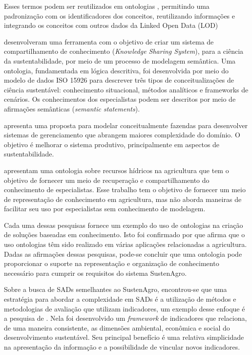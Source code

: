 Esses termos podem ser reutilizados em ontologias \citep{DCMIPro841},
permitindo uma padronização com os identificadores dos conceitos,
reutilizando informações e integrando os conceitos com outros dados
da \foreignlanguage{english}{Linked Open Data} (\foreignlanguage{english}{LOD})

\citet{kraines2011system} desenvolveram uma ferramenta com o objetivo
de criar um sistema de compartilhamento de conhecimento (\foreignlanguage{english}{\emph{Knowledge
Sharing System}}), para a ciência da sustentabilidade, por meio de
um processo de modelagem semântica. Uma ontologia, fundamentada em
lógica descritiva, foi desenvolvida por meio do modelo de dados ISO
15926 para descrever três tipos de conceitualizações de ciência sustentável:
conhecimento situacional, métodos analíticos e \foreignlanguage{english}{frameworks}
de cenários. Os conhecimentos dos especialistas podem ser descritos
por meio de afirmações semânticas (\foreignlanguage{english}{\emph{semantic
statements}}).

\citet{Abt2009} apresenta uma proposta para modelar conceitualmente
fazendas para desenvolver sistemas de gerenciamento que abrangem maiores
complexidade do domínio. O objetivo é melhorar o sistema produtivo,
principalmente em aspectos de sustentabilidade. 

\citet{Bonacin:2013:CIA:2536146.2536185} apresentam uma ontologia
sobre recursos hídricos na agricultura que tem o objetivo de fornecer
um meio de recuperação e compartilhamento do conhecimento de especialistas.
Esse trabalho tem o objetivo de fornecer um meio de representação
de conhecimento em agricultura, mas não aborda maneiras de facilitar
seu uso por especialistas sem conhecimento de modelagem.

Cada uma dessas pesquisas fornece um exemplo do uso de ontologias
na criação de soluções baseadas em conhecimento. Isto foi confirmado
por \citep{roussey2010ontologies} que afirma que o uso ontologias
têm sido realizado em várias aplicações relacionadas a agricultura.
Dadas as afirmações dessas pesquisas, pode-se concluir que uma ontologia
pode proporcionar o suporte na representação e organização de conhecimento
necessário para cumprir os requisitos do sistema SustenAgro.

Sobre a busca de SADs semelhantes ao SustenAgro, encontrou-se que
uma estratégia para abordar a complexidade em SADs é a utilização
de métodos e metodologias de avaliação que utilizam indicadores, um
exemplo desse enfoque é a pesquisa de \citet{AlkanOlsson:2009}. Nela
foi desenvolvido um \foreignlanguage{english}{\emph{framework}} de
indicadores que relaciona, de uma maneira consistente, as dimensões
ambiental, econômica e social do desenvolvimento sustentável. Seu
principal benefício é uma relativa simplicidade na apresentação da
informação e a possibilidade de vincular novos indicadores.

